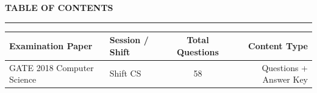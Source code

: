 \documentclass[a4paper,10pt,twoside]{article}
\begin{document}
\newpage

\begin{center}
    {\Large\textbf{TABLE OF CONTENTS}}\\[0.4em]
    \rule{0.5\textwidth}{0.6pt}
\end{center}
\vspace{1em}

\noindent\begin{tabularx}{\linewidth}{|X|l|c|r|}
\hline
\textbf{Examination Paper} & \textbf{Session / Shift} & \textbf{Total Questions} & \textbf{Content Type} \\
\hline

GATE 2018 Computer Science & Shift CS & 58 & Questions + Answer Key \\ \hline
\end{tabularx}

\vspace{1.5em}

\newpage
\end{document}
